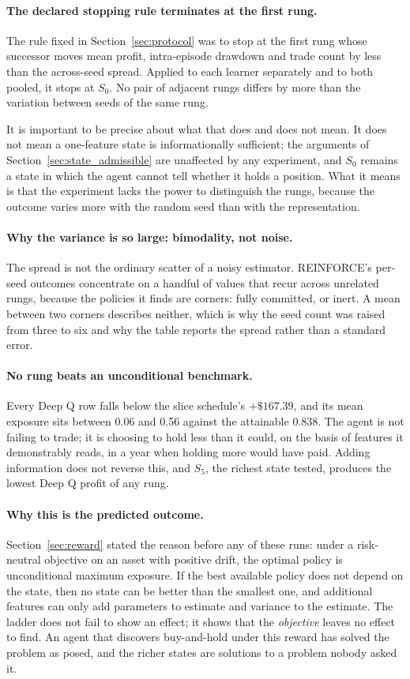 \paragraph{The declared stopping rule terminates at the first rung.} The
rule fixed in Section~\ref{sec:protocol} was to stop at the first rung
whose successor moves mean profit, intra-episode drawdown and trade count
by less than the across-seed spread. Applied to each learner separately and
to both pooled, it stops at $S_0$. No pair of adjacent rungs differs by
more than the variation between seeds of the same rung.

It is important to be precise about what that does and does not mean. It
does not mean a one-feature state is informationally sufficient; the
arguments of Section~\ref{sec:state_admissible} are unaffected by any
experiment, and $S_0$ remains a state in which the agent cannot tell
whether it holds a position. What it means is that the experiment lacks the
power to distinguish the rungs, because the outcome varies more with the
random seed than with the representation.

\paragraph{Why the variance is so large: bimodality, not noise.} The spread
is not the ordinary scatter of a noisy estimator. REINFORCE's per-seed
outcomes concentrate on a handful of values that recur across unrelated
rungs, because the policies it finds are corners: fully committed, or
inert. A mean between two corners describes neither, which is why the
seed count was raised from three to six and why the table reports the
spread rather than a standard error.

\paragraph{No rung beats an unconditional benchmark.} Every Deep Q row
falls below the slice schedule's $+\$167.39$, and its mean exposure sits
between 0.06 and 0.56 against the attainable 0.838. The agent is not
failing to trade; it is choosing to hold less than it could, on the basis of
features it demonstrably reads, in a year when holding more would have paid.
Adding information does not reverse this, and $S_5$, the richest state
tested, produces the lowest Deep Q profit of any rung.

\paragraph{Why this is the predicted outcome.}
Section~\ref{sec:reward} stated the reason before any of these runs: under
a risk-neutral objective on an asset with positive drift, the optimal policy
is unconditional maximum exposure. If the best available policy does not
depend on the state, then no state can be better than the smallest one, and
additional features can only add parameters to estimate and variance to the
estimate. The ladder does not fail to show an effect; it shows that the
\emph{objective} leaves no effect to find. An agent that discovers
buy-and-hold under this reward has solved the problem as posed, and the
richer states are solutions to a problem nobody asked it.

